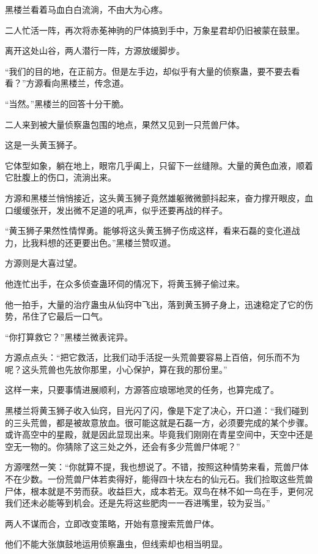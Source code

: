 \begin{this_body}
黑楼兰看着马血白白流淌，不由大为心疼。

二人忙活一阵，再次将赤莬神驹的尸体搞到手中，万象星君却仍旧被蒙在鼓里。

离开这处山谷，两人潜行一阵，方源放缓脚步。

“我们的目的地，在正前方。但是左手边，却似乎有大量的侦察蛊，要不要去看看？”方源看向黑楼兰，传念道。

“当然。”黑楼兰的回答十分干脆。

二人来到被大量侦察蛊包围的地点，果然又见到一只荒兽尸体。

这是一头黄玉狮子。

它体型如象，躺在地上，眼帘几乎阖上，只留下一丝缝隙。大量的黄色血液，顺着它肚腹上的伤口，流淌出来。

方源和黑楼兰悄悄接近，这头黄玉狮子竟然雄躯微微颤抖起来，奋力撑开眼皮，血口缓缓张开，发出微不足道的吼声，似乎还要再战的样子。

“黄玉狮子果然性情悍勇。能够将这头黄玉狮子伤成这样，看来石磊的变化道战力，比我料想的还更要出色。”黑楼兰赞叹道。

方源则是大喜过望。

他连忙出手，在众多侦查蛊环伺的情况下，将黄玉狮子偷过来。

他一拍手，大量的治疗蛊虫从仙窍中飞出，落到黄玉狮子身上，迅速稳定了它的伤势，吊住了它最后一口气。

“你打算救它？”黑楼兰微表诧异。

方源点点头：“把它救活，比我们动手活捉一头荒兽要容易上百倍，何乐而不为呢？这头荒兽也先放你那里，小心保护，算在我的那份里。”

这样一来，只要事情进展顺利，方源答应琅琊地灵的任务，也算完成了。

黑楼兰将黄玉狮子收入仙窍，目光闪了闪，像是下定了决心，开口道：“我们碰到的三头荒兽，都是被故意放血。很可能这就是石磊一方，必须要完成的某个步骤。或许高空中的星殿，就是因此显现出来。毕竟我们刚刚在青星空间中，天空中还是空无一物的。你猜除了这三处之外，还会有多少荒兽尸体呢？”

方源嘿然一笑：“你就算不提，我也想说了。不错，按照这种情势来看，荒兽尸体不在少数。一份荒兽尸体若卖得好，能得四十块左右的仙元石。我们捡取这些荒兽尸体，根本就是不劳而获。收益巨大，成本若无。双鸟在林不如一鸟在手，更何况我们还未必能等到机会。还是先将这些肥肉一一吞进嘴里，较为妥当。”

两人不谋而合，立即改变策略，开始有意搜索荒兽尸体。

他们不能大张旗鼓地运用侦察蛊虫，但线索却也相当明显。


\end{this_body}
